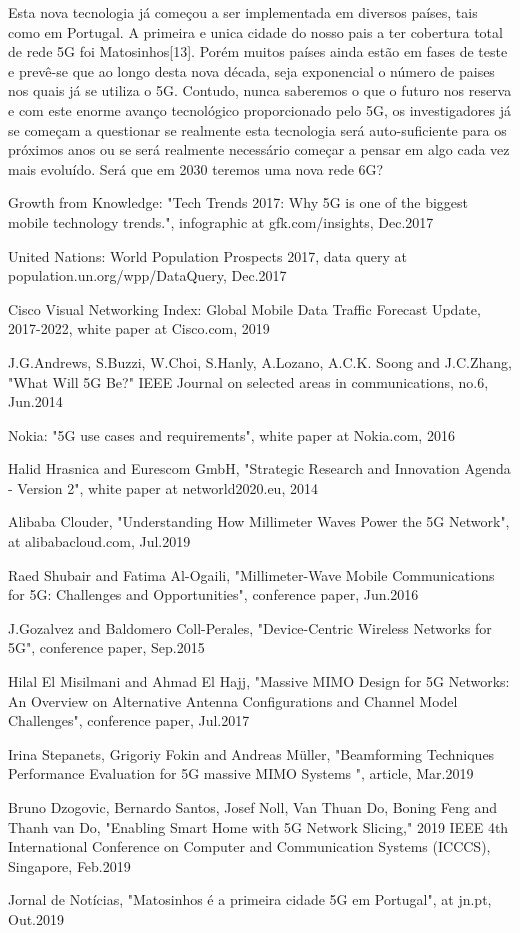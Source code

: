 \documentclass[conference]{IEEEtran}
\begin{document}
Esta nova tecnologia já começou a ser implementada em diversos países, tais como em Portugal. A primeira e unica cidade do nosso pais a ter cobertura total de rede 5G foi Matosinhos[13]. Porém muitos países ainda estão em fases de teste e prevê-se que ao longo desta nova década, seja exponencial o número de paises nos quais já se utiliza o 5G. Contudo, nunca saberemos o que o futuro nos reserva e com este enorme avanço tecnológico proporcionado pelo 5G, os investigadores já se começam a questionar se realmente esta tecnologia será auto-suficiente para os próximos anos ou se será realmente necessário começar a pensar em algo cada vez mais evoluído. Será que em 2030 teremos uma nova rede 6G?


\begin{thebibliography}{13}
Growth from Knowledge:
"Tech Trends 2017: Why 5G is one of the biggest mobile technology trends.",
infographic at gfk.com/insights, Dec.2017

United Nations:
World Population Prospects 2017,
data query at population.un.org/wpp/DataQuery, Dec.2017

Cisco Visual Networking Index:
Global Mobile Data Traffic Forecast Update, 2017-2022,
white paper at Cisco.com, 2019

J.G.Andrews, S.Buzzi, W.Choi, S.Hanly, A.Lozano,
A.C.K. Soong and J.C.Zhang,
"What Will 5G Be?" IEEE Journal on selected areas in communications,
no.6, Jun.2014

Nokia:
"5G use cases and requirements",
white paper at Nokia.com, 2016

Halid Hrasnica and Eurescom GmbH,
"Strategic Research and Innovation Agenda - Version 2",
white paper at networld2020.eu, 2014

Alibaba Clouder,
"Understanding How Millimeter Waves Power the 5G Network",
at alibabacloud.com, Jul.2019

Raed Shubair and Fatima Al-Ogaili,
"Millimeter-Wave Mobile Communications for 5G: Challenges and Opportunities", conference paper, Jun.2016

J.Gozalvez and Baldomero Coll-Perales,
"Device-Centric Wireless Networks for 5G", conference paper, Sep.2015

Hilal El Misilmani and Ahmad El Hajj,
"Massive MIMO Design for 5G Networks: An Overview on Alternative Antenna Configurations and Channel Model Challenges",
conference paper, Jul.2017

Irina Stepanets, Grigoriy Fokin and Andreas Müller,
"Beamforming Techniques Performance Evaluation for 5G massive MIMO Systems ",
article, Mar.2019

Bruno Dzogovic, Bernardo Santos, Josef Noll, Van Thuan Do,
Boning Feng and Thanh van Do,
"Enabling Smart Home with 5G Network Slicing," 2019 IEEE 4th International Conference on Computer and Communication Systems (ICCCS), Singapore, Feb.2019

Jornal de Notícias,
"Matosinhos é a primeira cidade 5G em Portugal",
at jn.pt, Out.2019

\end{thebibliography}
\end{document}
